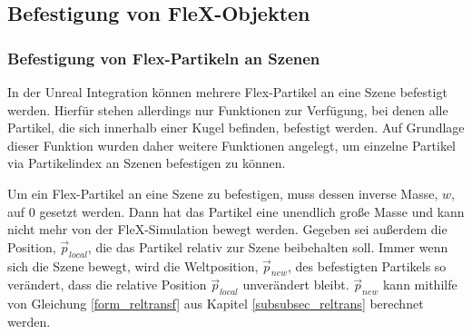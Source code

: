 \subsection{Befestigung von FleX-Objekten}
\label{subsec_attach}

%
%

\subsubsection{Befestigung von Flex-Partikeln an Szenen}

In der Unreal Integration können mehrere Flex-Partikel an eine Szene befestigt werden. Hierfür stehen allerdings nur Funktionen zur Verfügung, bei denen alle Partikel, die sich innerhalb einer Kugel befinden, befestigt werden. Auf Grundlage dieser Funktion wurden daher weitere Funktionen angelegt, um einzelne Partikel via Partikelindex an Szenen befestigen zu können.

Um ein Flex-Partikel an eine Szene zu befestigen, muss dessen inverse Masse, $w$, auf 0 gesetzt werden. Dann hat das Partikel eine unendlich große Masse und kann nicht mehr von der FleX-Simulation bewegt werden. 
Gegeben sei außerdem die Position, $\vec{p}_{local}$, die das Partikel relativ zur Szene beibehalten soll. Immer wenn sich die Szene bewegt, wird die Weltposition, $\vec{p}_{new}$, des befestigten Partikels so verändert, dass die relative Position $\vec{p}_{local}$ unverändert bleibt.
$\vec{p}_{new}$ kann mithilfe von Gleichung \ref{form_reltransf} aus Kapitel \ref{subsubsec_reltrans} berechnet werden.



